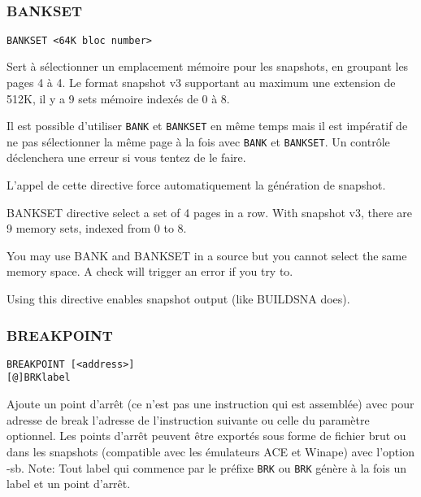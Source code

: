 \subsection{}

\subsubsection{BANKSET}
\begin{verbatim}
BANKSET <64K bloc number>
\end{verbatim}

\begin{xfr}
Sert à sélectionner un emplacement mémoire pour les snapshots, en groupant les pages 4 à 4. Le format snapshot v3 supportant au maximum une extension de 512K, il y a 9 sets mémoire indexés de 0 à 8.

Il est possible d'utiliser \texttt{BANK} et \texttt{BANKSET} en même temps mais il est impératif de ne pas sélectionner la même page à la fois avec \texttt{BANK} et \texttt{BANKSET}. Un contrôle déclenchera une erreur si vous tentez de le faire.

L'appel de cette directive force automatiquement la génération de snapshot.
\end{xfr}

\begin{xen}
BANKSET directive select a set of 4 pages in a row. With snapshot v3, there are 9 memory sets, indexed from 0 to 8.

You may use BANK and BANKSET in a source but you cannot select the same memory space. A check will trigger an error if you try to.

Using this directive enables snapshot output (like BUILDSNA does).
\end{xen}


\subsubsection{BREAKPOINT}\label{BREAKPOINT}

\begin{verbatim}
BREAKPOINT [<address>]
[@]BRKlabel
\end{verbatim}

\begin{xfr}

Ajoute un point d'arrêt (ce n'est pas une instruction qui est assemblée) avec pour adresse de break l'adresse de l'instruction suivante ou celle du paramètre optionnel. Les points d'arrêt peuvent être exportés sous forme de fichier brut ou dans les snapshots (compatible avec les émulateurs ACE et Winape) avec l'option -sb.
Note: Tout label qui commence par le préfixe \texttt{BRK} ou \texttt{\at BRK} génère à la fois un label et un point d'arrêt.
\end{xfr}

